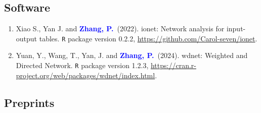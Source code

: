 \documentclass[12pt]{article}
\newcommand{\PZnot}{\textcolor{blue}{\textbf{Zhang, P.}}}
\begin{document}
	\subsection*{Software}
	\begin{enumerate}
		\item{\sc Xiao S., Yan J.} and \PZnot\ (2022).
		ionet: Network analysis for input-output tables. {\tt R} 
		package version 0.2.2, 
		\url{https://github.com/Carol-seven/ionet}.
		
		\item {\sc Yuan, Y., Wang, T., Yan, J.} and \PZnot\ (2024). 
		wdnet: Weighted and Directed Network. {\tt R} package 
		version 
		1.2.3, 
		\url{https://cran.r-project.org/web/packages/wdnet/index.html}.
	\end{enumerate}
	
	\subsection*{Preprints}
\end{document}
